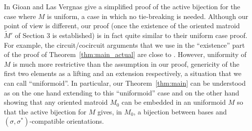\documentclass[12pt]{amsart}
\numberwithin{equation}{section}
\theoremstyle{definition}
\newcommand{\paco}[1]{\todo[color=orange!30]{\footnotesize \rm #1 \\ \hfill --- P.}}
\begin{document}

\medskip
In \cite[Section 3]{GLV_Uniform} Gioan and Las Vergnas give a simplified proof of  the active bijection for the case where $M$ is uniform, a case in which no tie-breaking is needed. Although our point of view is different, our proof (once the existence of the oriented matroid $\widetilde M'$ of Section 3 is established) is in fact quite similar to their uniform case proof. For example, the circuit/cocircuit arguments that we use in the ``existence'' part of the proof of Theorem~\ref{thm:main_actual} are  close to \cite[Lemma 3.2.3]{GLV_Uniform}.
However, uniformity of $M$ is much more restrictive than the  assumption in our proof, genericity of the first two elements as a lifting and an extension respectively, a situation that we can call ``uniformoid''. In particular, our Theorem~\ref{thm:main} can be understood as on the one hand extending \cite{GLV_Uniform} to this ``uniformoid'' case and on the other hand showing that any oriented matroid $M_0$ can be embedded in an uniformoid $M$ so that the active bijection for $M$ gives, in $M_0$, a bijection between bases and $(\sigma, \sigma^*)$-compatible orientations.

\end{document}
